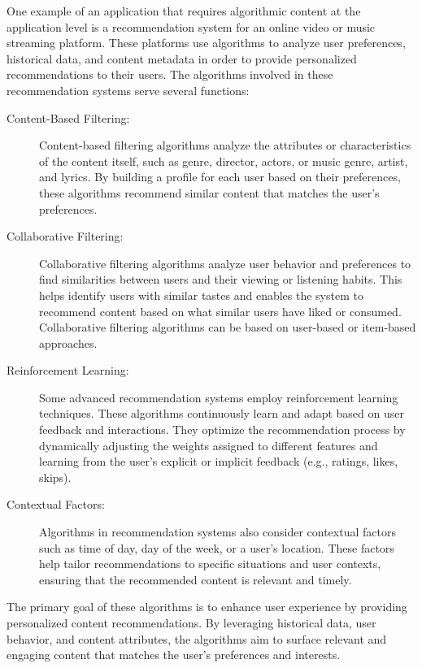 One example of an application that requires algorithmic content at the application level is a recommendation system for an online video or music streaming platform.
These platforms use algorithms to analyze user preferences, historical data, and content metadata in order to provide personalized recommendations to their users.
The algorithms involved in these recommendation systems serve several functions:
\begin{description}
    \item[Content-Based Filtering:] Content-based filtering algorithms analyze the attributes or characteristics of the content itself, such as genre, director, actors, or music genre, artist, and lyrics.
    By building a profile for each user based on their preferences, these algorithms recommend similar content that matches the user's preferences.
    \item[Collaborative Filtering:] Collaborative filtering algorithms analyze user behavior and preferences to find similarities between users and their viewing or listening habits.
    This helps identify users with similar tastes and enables the system to recommend content based on what similar users have liked or consumed.
    Collaborative filtering algorithms can be based on user-based or item-based approaches.
    \item[Reinforcement Learning:] Some advanced recommendation systems employ reinforcement learning techniques.
    These algorithms continuously learn and adapt based on user feedback and interactions.
    They optimize the recommendation process by dynamically adjusting the weights assigned to different features and learning from the user's explicit or implicit feedback (e.g., ratings, likes, skips).
    \item[Contextual Factors:] Algorithms in recommendation systems also consider contextual factors such as time of day, day of the week, or a user's location.
    These factors help tailor recommendations to specific situations and user contexts, ensuring that the recommended content is relevant and timely.
\end{description}
The primary goal of these algorithms is to enhance user experience by providing personalized content recommendations.
By leveraging historical data, user behavior, and content attributes, the algorithms aim to surface relevant and engaging content that matches the user's preferences and interests.
